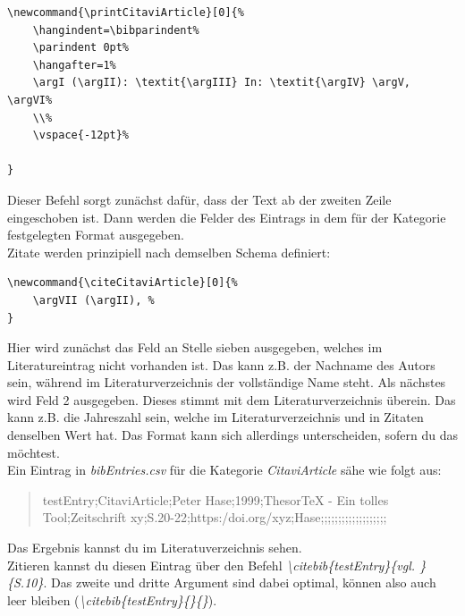\documentclass[12pt]{article}
\begin{document}
\begin{lstlisting}
\newcommand{\printCitaviArticle}[0]{%
    \hangindent=\bibparindent%
    \parindent 0pt%
    \hangafter=1%
    \argI (\argII): \textit{\argIII} In: \textit{\argIV} \argV, \argVI%
    \\%
    \vspace{-12pt}%

}
\end{lstlisting}
Dieser Befehl sorgt zunächst dafür, dass der Text ab der zweiten Zeile eingeschoben ist. Dann werden die Felder des Eintrags in dem für der Kategorie festgelegten Format ausgegeben.\\
Zitate werden prinzipiell nach demselben Schema definiert:
\begin{lstlisting}
\newcommand{\citeCitaviArticle}[0]{%
    \argVII (\argII), %
}
\end{lstlisting}
Hier wird zunächst das Feld an Stelle sieben ausgegeben, welches im Literatureintrag nicht vorhanden ist. Das kann z.B. der Nachname des Autors sein, während im Literaturverzeichnis der vollständige Name steht. Als nächstes wird Feld 2 ausgegeben. Dieses stimmt mit dem Literaturverzeichnis überein. Das kann z.B. die Jahreszahl sein, welche im Literaturverzeichnis und in Zitaten denselben Wert hat. Das Format kann sich allerdings unterscheiden, sofern du das möchtest.\\
Ein Eintrag in \textit{bibEntries.csv} für die Kategorie \textit{CitaviArticle} sähe wie folgt aus:
\begin{quote}
testEntry;CitaviArticle;Peter Hase;1999;ThesorTeX - Ein tolles Tool;Zeitschrift xy;S.20-22;https:/doi.org/xyz;Hase;;;;;;;;;;;;;;;;;;;
\end{quote}
Das Ergebnis kannst du im Literatuverzeichnis sehen.\\
Zitieren kannst du diesen Eintrag über den Befehl \textit{\textbackslash citebib\{testEntry\}\{vgl. \}\{S.10\}}. Das zweite und dritte Argument sind dabei optimal, können also auch leer bleiben (\textit{\textbackslash citebib\{testEntry\}\{\}\{\}}).

\clearpage
\frontmatter%
\renewcommand{\plaintitle}{Literaturverzeichnis}
\setcounter{page}{5}
\printMyBibliography
\clearpage
\renewcommand{\plaintitle}{Anhang}
{\def\makebox[#1][#2]#3{#3}%
    \listofanhang
}
\end{document}
